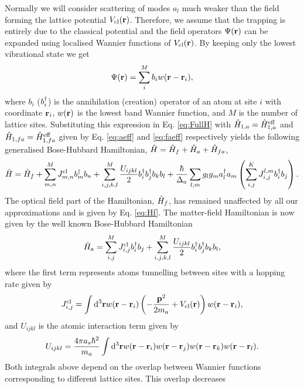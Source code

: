 Normally we will consider scattering of modes $a_l$ much weaker than
the field forming the lattice potential
$V_\mathrm{cl}(\mathbf{r})$. Therefore, we assume that the trapping is
entirely due to the classical potential and the field operators
$\Psi(\mathbf{r})$ can be expanded using localised Wannier functions of
$V_\mathrm{cl}(\mathbf{r})$. By keeping only the lowest vibrational state
we get
\begin{equation}
  \Psi(\mathbf{r}) = \sum_i^M b_i w(\mathbf{r} - \mathbf{r}_i),
\end{equation} 
where $b_i$ ($b^\dagger_i$) is the annihilation (creation) operator of an
atom at site $i$ with coordinate $\mathbf{r}_i$, $w(\mathbf{r})$ is the lowest
band Wannier function, and $M$ is the number of lattice
sites. Substituting this expression in Eq. \eqref{eq:FullH} with
$\hat{H}_{1,a} = \hat{H}_{1,a}^\mathrm{eff}$ and
$\hat{H}_{1,fa} = \hat{H}_{1,fa}^\mathrm{eff}$ given by Eq. \eqref{eq:aeff} and
\eqref{eq:faeff} respectively yields the following generalised
Bose-Hubbard Hamiltonian, $\hat{H} = \hat{H}_f + \hat{H}_a + \hat{H}_{fa}$,
\begin{equation}
  \hat{H} = \hat{H}_f + \sum_{m,n}^M J^\mathrm{cl}_{m,n} b^\dagger_m b_n + 
  \sum_{i,j,k,l}^M \frac{U_{ijkl}}{2} b^\dagger_i b^\dagger_j b_k b_l + 
  \frac{\hbar}{\Delta_a} \sum_{l,m} g_l g_m a^\dagger_l a_m 
  \left( \sum_{i,j}^K J^{l,m}_{i,j} b^\dagger_i b_j \right).
\end{equation}
The optical field part of the Hamiltonian, $\hat{H}_f$, has remained
unaffected by all our approximations and is given by
Eq. \eqref{eq:Hf}. The matter-field Hamiltonian is now given by the
well known Bose-Hubbard Hamiltonian
\begin{equation}
  \hat{H}_a = \sum_{i,j}^M J^\mathrm{cl}_{i,j} b^\dagger_i b_j + 
  \sum_{i,j,k,l}^M \frac{U_{ijkl}}{2} b^\dagger_i b^\dagger_j b_k b_l,
\end{equation}
where the first term represents atoms tunnelling between sites with a
hopping rate given by
\begin{equation}
  J^\mathrm{cl}_{i,j} = \int \mathrm{d}^3 \mathbf{r} w (\mathbf{r} - \mathbf{r}_i ) 
  \left( -\frac{\mathbf{p}^2}{2 m_a} + V_\mathrm{cl}(\mathbf{r}) \right) w(\mathbf{r}
  - \mathbf{r}_i),
\end{equation}
and $U_{ijkl}$ is the atomic interaction term given by
\begin{equation}
  U_{ijkl} = \frac{4 \pi a_s \hbar^2}{m_a} \int \mathrm{d}^3 \mathbf{r} 
  w(\mathbf{r} - \mathbf{r}_i) w(\mathbf{r} - \mathbf{r}_j) w(\mathbf{r} - \mathbf{r}_k) w(\mathbf{r} - \mathbf{r}_l).
\end{equation}
Both integrals above depend on the overlap between Wannier functions
corresponding to different lattice sites. This overlap decreases
